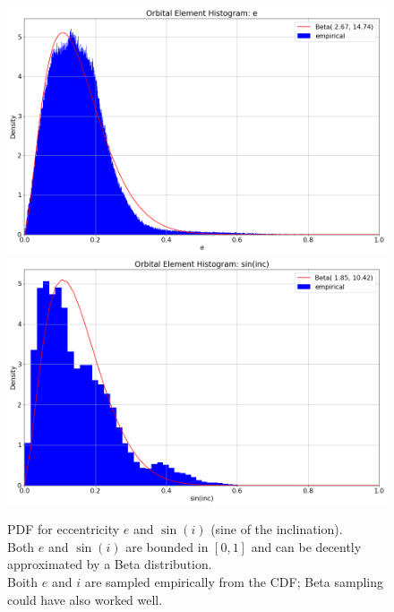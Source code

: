 \begin{figure}[hbt!]
\begin{center}
\includegraphics[width=1.0\textwidth]{../figs/elts/elt_hist_e.png}
\includegraphics[width=1.0\textwidth]{../figs/elts/elt_hist_i.png}
\caption{PDF for eccentricity $e$ and $\sin(i)$ (sine of the inclination).\\
Both $e$ and $\sin(i)$ are bounded in $[0, 1]$ and can be decently approximated by a Beta distribution.\\
Boith $e$ and $i$ are sampled empirically from the CDF; Beta sampling could have also worked well.}
\end{center}
\end{figure}
\clearpage

